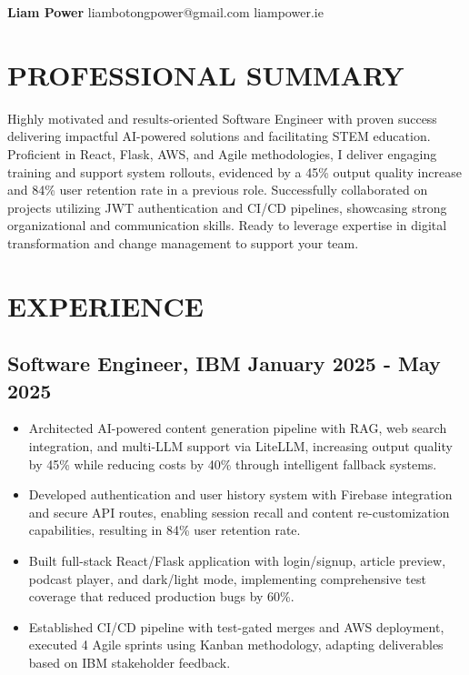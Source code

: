 \documentclass[10pt,a4paper]{article}
\begin{document}
\begin{center}
{\large\bfseries Liam Power} \hfill {\large liambotongpower@gmail.com} \hfill {\large liampower.ie}
\end{center}

\section{PROFESSIONAL SUMMARY} 


Highly motivated and results-oriented Software Engineer with proven success delivering impactful AI-powered solutions and facilitating STEM education. Proficient in React, Flask, AWS, and Agile methodologies, I deliver engaging training and support system rollouts, evidenced by a 45\% output quality increase and 84\% user retention rate in a previous role. Successfully collaborated on projects utilizing JWT authentication and CI/CD pipelines, showcasing strong organizational and communication skills. Ready to leverage expertise in digital transformation and change management to support your team.


\section{EXPERIENCE}

\subsection{Software Engineer, IBM \hfill January 2025 - May 2025}
\begin{itemize}
\item Architected AI-powered content generation pipeline with RAG, web search integration, and multi-LLM support via LiteLLM, increasing output quality by 45\% while reducing costs by 40\% through intelligent fallback systems.
\item Developed authentication and user history system with Firebase integration and secure API routes, enabling session recall and content re-customization capabilities, resulting in 84\% user retention rate.
\item Built full-stack React/Flask application with login/signup, article preview, podcast player, and dark/light mode, implementing comprehensive test coverage that reduced production bugs by 60\%.
\item Established CI/CD pipeline with test-gated merges and AWS deployment, executed 4 Agile sprints using Kanban methodology, adapting deliverables based on IBM stakeholder feedback.
\end{itemize}
\end{document}
